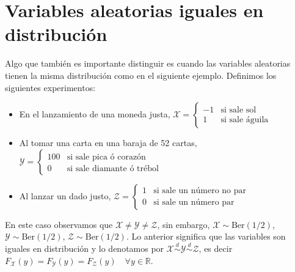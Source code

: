 \section{Variables aleatorias iguales en distribución}
Algo que también es importante distinguir es cuando las variables aleatorias tienen la misma distribución como en el siguiente ejemplo.
Definimos los siguientes experimentos:
\begin{itemize}
    \item En el lanzamiento de una moneda justa, $\mathcal X=\begin{cases}
        -1 & \text{si sale sol}\\
        1 & \text{si sale águila}
    \end{cases}$

    \item Al tomar una carta en una baraja de 52 cartas, $\mathcal Y=\begin{cases}
        100 & \text{si sale pica ó corazón}\\
        0 & \text{si sale diamante ó trébol}
    \end{cases}$

    \item Al lanzar un dado justo, $\mathcal Z=\begin{cases}
        1 & \text{si sale un número no par}\\
        0 & \text{si sale un número par}
    \end{cases}$
\end{itemize}
En este caso observamos que $\mathcal X \neq \mathcal Y \neq \mathcal Z$, sin embargo, $\mathcal X \sim \text{Ber}(1/2)$, $\mathcal Y \sim \text{Ber}(1/2)$, $\mathcal Z \sim \text{Ber}(1/2)$. Lo anterior significa que las variables son iguales en distribución y lo denotamos por $\mathcal X \stackrel{d}{\sim} \mathcal Y \stackrel{d}{\sim} \mathcal Z$, es decir $F_{\mathcal X}(y)=F_{\mathcal Y}(y)=F_{\mathcal Z}(y) \quad \forall y \in \mathbb{R}$.



